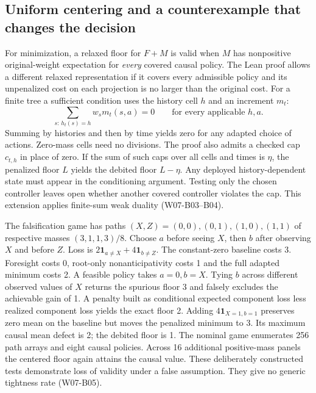 \documentclass[11pt,letterpaper]{article}
\begin{document}
\subsection{Uniform centering and a counterexample that changes the decision}
For minimization, a relaxed floor for $F+M$ is valid when $M$ has nonpositive original-weight expectation for \emph{every} covered causal policy. The Lean proof allows a different relaxed representation if it covers every admissible policy and its unpenalized cost on each projection is no larger than the original cost. For a finite tree a sufficient condition uses the history cell $h$ and an increment $m_t$:
\[
 \sum_{s:\,h_t(s)=h} w_s m_t(s,a)=0\qquad \text{for every applicable }h,a .
\]
Summing by histories and then by time yields zero for any adapted choice of actions. Zero-mass cells need no divisions. The proof also admits a checked cap $c_{t,h}$ in place of zero. If the sum of such caps over all cells and times is $\eta$, the penalized floor $L$ yields the debited floor $L-\eta$. Any deployed history-dependent state must appear in the conditioning argument. Testing only the chosen controller leaves open whether another covered controller violates the cap. This extension applies finite-sum weak duality (W07-B03--B04).

The falsification game has paths $(X,Z)=(0,0),(0,1),(1,0),(1,1)$ of respective masses $(3,1,1,3)/8$. Choose $a$ before seeing $X$, then $b$ after observing $X$ and before $Z$. Loss is $2\mathbf{1}_{a\ne X}+4\mathbf{1}_{b\ne Z}$. The constant-zero baseline costs 3. Foresight costs 0, root-only nonanticipativity costs 1 and the full adapted minimum costs 2. A feasible policy takes $a=0,b=X$. Tying $b$ across different observed values of $X$ returns the spurious floor 3 and falsely excludes the achievable gain of 1. A penalty built as conditional expected component loss less realized component loss yields the exact floor 2. Adding $4\mathbf{1}_{X=1,b=1}$ preserves zero mean on the baseline but moves the penalized minimum to 3. Its maximum causal mean defect is 2; the debited floor is 1. The nominal game enumerates 256 path arrays and eight causal policies. Across 16 additional positive-mass panels the centered floor again attains the causal value. These deliberately constructed tests demonstrate loss of validity under a false assumption. They give no generic tightness rate (W07-B05).
\end{document}
